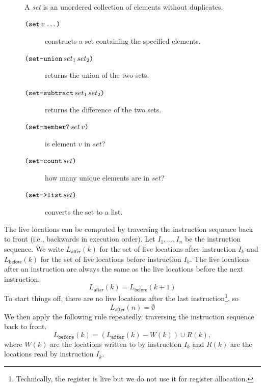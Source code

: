 \documentclass[11pt]{book}
\begin{document}
\begin{figure}
  \small
  \begin{tcolorbox}[title=\href{https://docs.racket-lang.org/reference/sets.html}{The Racket Set Package}]
    A \emph{set} is an unordered collection of elements without duplicates.
  \begin{description}
  \item[$\texttt{(}\texttt{set}\,v\,\ldots\texttt{)}$] constructs a set containing the specified elements.
  \item[$\texttt{(}\texttt{set-union}\,set_1\,set_2\texttt{)}$] returns the union of the two sets.
  \item[$\texttt{(}\texttt{set-subtract}\,set_1\,set_2\texttt{)}$] returns the difference of the two sets.
  \item[$\texttt{(}\texttt{set-member?}\,set\,v\texttt{)}$] is element $v$ in $set$?
  \item[$\texttt{(}\texttt{set-count}\,set\texttt{)}$] how many unique elements are in $set$?
  \item[$\texttt{(}\texttt{set->list}\,set\texttt{)}$] converts the set to a list.
  \end{description}
  \end{tcolorbox}
\end{figure}

The live locations can be computed by traversing the instruction
sequence back to front (i.e., backwards in execution order).  Let
$I_1,\ldots, I_n$ be the instruction sequence. We write
$L_{\mathsf{after}}(k)$ for the set of live locations after
instruction $I_k$ and $L_{\mathsf{before}}(k)$ for the set of live
locations before instruction $I_k$. The live locations after an
instruction are always the same as the live locations before the next
instruction.   
\begin{equation} \label{eq:live-after-before-next}
  L_{\mathsf{after}}(k) = L_{\mathsf{before}}(k+1)
\end{equation}
To start things off, there are no live locations after the last
instruction\footnote{Technically, the  register is live
but we do not use it for register allocation.}, so
\begin{equation}\label{eq:live-last-empty}
  L_{\mathsf{after}}(n) = \emptyset
\end{equation}
We then apply the following rule repeatedly, traversing the
instruction sequence back to front.
\begin{equation}\label{eq:live-before-after-minus-writes-plus-reads}
  L_{\mathtt{before}}(k) = (L_{\mathtt{after}}(k) - W(k)) \cup R(k),
\end{equation}
where $W(k)$ are the locations written to by instruction $I_k$ and
$R(k)$ are the locations read by instruction $I_k$.
\end{document}

